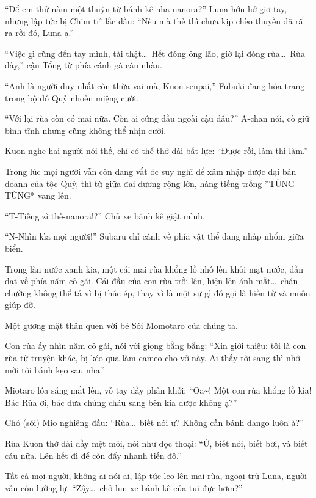 \documentclass[../main.tex]{subfiles}
\begin{document}
``Để em thử nàm một thuỳn từ bánh kê nha-nanora?'' Luna hớn hở giơ tay, nhưng lập tức bị Chim trĩ lắc đầu: ``Nếu mà thế thì chưa kịp chèo thuyền đã rã ra rồi đó, Luna ạ.''

\il

``Việc gì cũng đến tay mình, tài thật\dots\ Hết đóng ông lão, giờ lại đóng rùa\dots\ Rùa đấy,''  cậu Tổng từ phía cánh gà càu nhàu.

``Anh là người duy nhất còn thừa vai mà, Kuon-senpai,'' Fubuki đang hóa trang trong bộ đồ Quỷ nhoẻn miệng cười.

``Với lại rùa còn có mai nữa. Còn ai cứng đầu ngoài cậu đâu?'' A-chan nói, cố giữ bình tĩnh nhưng cũng không thể nhịn cười.

Kuon nghe hai người nói thế, chỉ có thể thở dài bất lực: ``Được rồi, làm thì làm.''

\il

Trong lúc mọi người vẫn còn đang vắt óc suy nghĩ để xâm nhập được đại bản doanh của tộc Quỷ, thì từ giữa đại dương rộng lớn, hàng tiếng trống *TÙNG TÙNG* vang lên.

``T-Tiếng zì thế-nanora!?'' Chủ xe bánh kê giật mình.

``N-Nhìn kìa mọi người!'' Subaru chỉ cánh về phía vật thể đang nhấp nhổm giữa biển.

Trong làn nước xanh kia, một cái mai rùa khổng lồ  nhô lên khỏi mặt nước, dần dạt về phía năm cô gái. Cái đầu của con rùa trồi lên, hiện lên ánh mắt\dots\ chán chường không thể tả vì bị thúc ép, thay vì là một sự gì đó gọi là hiền từ và muốn giúp đỡ.

Một gương mặt thân quen với bé Sói Momotaro của chúng ta.

Con rùa ấy nhìn năm cô gái, nói với giọng bằng bằng: ``Xin giới thiệu: tôi là con rùa từ truyện khác, bị kéo qua làm cameo cho vở này. Ai thấy tôi sang thì nhớ mời tôi bánh kẹo sau nha.''

Miotaro lóa sáng mắt lên, vỗ tay đầy phấn khởi: ``Oa\~{}! Một con rùa khổng lồ kìa! Bác Rùa ơi, bác đưa chúng cháu sang bên kia được không ạ?''

Chó (sói) Mio nghiêng đầu: ``Rùa\dots\ biết nói ư? Không cần bánh dango luôn à?''

Rùa Kuon thở dài đầy mệt mỏi, nói như đọc thoại: ``Ừ, biết nói, biết bơi, và biết cáu nữa. Lên hết đi để còn đẩy nhanh tiến độ.''

Tất cả mọi người, không ai nói ai, lập tức leo lên mai rùa, ngoại trừ Luna, người vẫn còn lưỡng lự. ``Zậy\dots\ chở lun xe bánh kê của tui đực hơm?''
\end{document}
